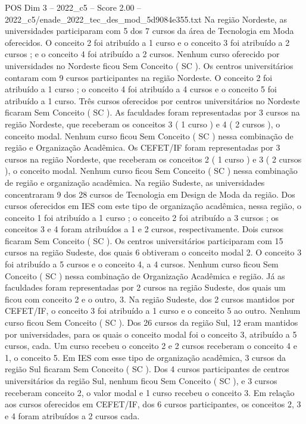 \begin{textsample}{POS Dim 3 – 2022\_c5 – Score 2.00 – 2022\_c5/enade\_2022\_tec\_des\_mod\_5d9084e355.txt}
Na região Nordeste, as universidades participaram com 5 dos 7 cursos da área de Tecnologia em Moda oferecidos.
O conceito 2 foi atribuído a 1 curso e o conceito 3 foi atribuído a 2 cursos ; e o conceito 4 foi atribuído a 2 cursos.
Nenhum curso oferecido por universidades no Nordeste ficou Sem Conceito ( SC ).
Os centros universitários contaram com 9 cursos participantes na região Nordeste.
O conceito 2 foi atribuído a 1 curso ; o conceito 4 foi atribuído a 4 cursos e o conceito 5 foi atribuído a 1 curso.
Três cursos oferecidos por centros universitários no Nordeste ficaram Sem Conceito ( SC ).
As faculdades foram representadas por 3 cursos na região Nordeste, que receberam os conceitos 3 ( 1 curso ) e 4 ( 2 cursos ), o conceito modal.
Nenhum curso ficou Sem Conceito ( SC ) nessa combinação de região e Organização Acadêmica.
Os CEFET/IF foram representadas por 3 cursos na região Nordeste, que receberam os conceitos 2 ( 1 curso ) e 3 ( 2 cursos ), o conceito modal.
Nenhum curso ficou Sem Conceito ( SC ) nessa combinação de região e organização acadêmica.
Na região Sudeste, as universidades concentraram 9 dos 28 cursos de Tecnologia em Design de Moda da região.
Dos cursos oferecidos em IES com este tipo de organização acadêmica, nessa região, o conceito 1 foi atribuído a 1 curso ; o conceito 2 foi atribuído a 3 cursos ; os conceitos 3 e 4 foram atribuídos a 1 e 2 cursos, respectivamente.
Dois cursos ficaram Sem Conceito ( SC ).
Os centros universitários participaram com 15 cursos na região Sudeste, dos quais 6 obtiveram o conceito modal 2.
O conceito 3 foi atribuído a 5 cursos e o conceito 4, a 4 cursos.
Nenhum curso ficou Sem Conceito ( SC ) nessa combinação de Organização Acadêmica e região.
Já as faculdades foram representadas por 2 cursos na região Sudeste, dos quais um ficou com conceito 2 e o outro, 3.
Na região Sudeste, dos 2 cursos mantidos por CEFET/IF, o conceito 3 foi atribuído a 1 curso e o conceito 5 ao outro.
Nenhum curso ficou Sem Conceito ( SC ).
Dos 26 cursos da região Sul, 12 eram mantidos por universidades, para os quais o conceito modal foi o conceito 3, atribuído a 5 cursos, cada.
Um curso recebeu o conceito 2 e 2 cursos receberam o conceito 4 e 1, o conceito 5.
Em IES com esse tipo de organização acadêmica, 3 cursos da região Sul ficaram Sem Conceito ( SC ).
Dos 4 cursos participantes de centros universitários da região Sul, nenhum ficou Sem Conceito ( SC ), e 3 cursos receberam conceito 2, o valor modal e 1 curso recebeu o conceito 3.
Em relação aos cursos oferecidos em CEFET/IF, dos 6 cursos participantes, os conceitos 2, 3 e 4 foram atribuídos a 2 cursos cada.

\end{textsample}
